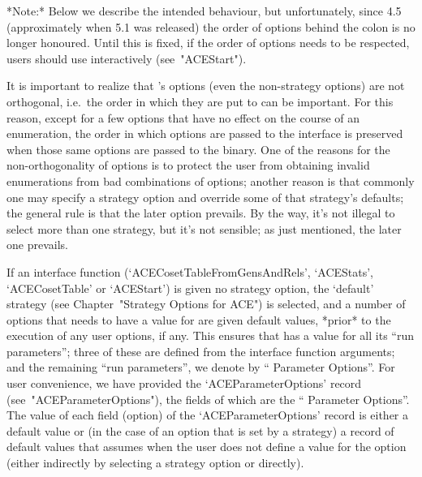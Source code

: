 *Note:* Below we describe the intended behaviour,  but  unfortunately,
since {\GAP} 4.5  (approximately  when  {\ACE} 5.1  was  released) the
order of options  behind  the colon  is no longer honoured. Until this
is fixed, if the order of {\ACE} options needs to be respected,  users
should use {\ACE} interactively (see~"ACEStart").

It  is  important  to  realize  that  {\ACE}'s   options   (even   the
non-strategy options) are not orthogonal, i.e.\  the  order  in  which
they are put to {\ACE} can be important. For this reason, except for a
few options that have no effect on the course of an  enumeration,  the
order in which options are passed to the {\ACE} interface is preserved
when those same options are passed to the {\ACE} binary.  One  of  the
reasons for the non-orthogonality of options is to  protect  the  user
from obtaining invalid enumerations from bad combinations of  options;
another reason is that commonly one may specify a strategy option  and
override some of that strategy's defaults; the general  rule  is  that
the later option prevails. By the way, it's not illegal to select more
than one strategy, but it's not sensible; as just mentioned, the later
one prevails.


If  an  {\ACE}  interface  function   (`ACECosetTableFromGensAndRels',
`ACEStats',  `ACECosetTable'  or  `ACEStart')  is  given  no  strategy
option, the `default'  strategy  (see  Chapter~"Strategy  Options  for
ACE") is selected, and a number of options that {\ACE} needs to have a
value for are given default values, *prior* to the  execution  of  any
user options, if any. This ensures that {\ACE} has a value for all its
``run parameters'';  three  of  these  are  defined  from  the  {\ACE}
interface function arguments; and the remaining ``run parameters'', we
denote by ``{\ACE} Parameter Options''. For user convenience, we  have
provided the `ACEParameterOptions' record (see~"ACEParameterOptions"),
the fields of which are the ``{\ACE} Parameter Options''. The value of
each field (option) of the `ACEParameterOptions' record  is  either  a
default value or (in the case of an option that is set by a  strategy)
a record of default values that {\ACE} assumes when the user does  not
define a value for  the  option  (either  indirectly  by  selecting  a
strategy option or directly).

